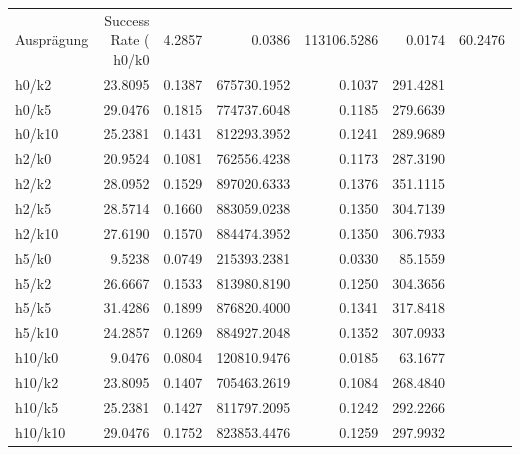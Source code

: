 \begin{tabular}{lrrrrr}
\toprule
Ausprägung & Success Rate (%
\midrule
h0/k0 & 4.2857 & 0.0386 & 113106.5286 & 0.0174 & 60.2476 \\
h0/k2 & 23.8095 & 0.1387 & 675730.1952 & 0.1037 & 291.4281 \\
h0/k5 & 29.0476 & 0.1815 & 774737.6048 & 0.1185 & 279.6639 \\
h0/k10 & 25.2381 & 0.1431 & 812293.3952 & 0.1241 & 289.9689 \\
h2/k0 & 20.9524 & 0.1081 & 762556.4238 & 0.1173 & 287.3190 \\
h2/k2 & 28.0952 & 0.1529 & 897020.6333 & 0.1376 & 351.1115 \\
h2/k5 & 28.5714 & 0.1660 & 883059.0238 & 0.1350 & 304.7139 \\
h2/k10 & 27.6190 & 0.1570 & 884474.3952 & 0.1350 & 306.7933 \\
h5/k0 & 9.5238 & 0.0749 & 215393.2381 & 0.0330 & 85.1559 \\
h5/k2 & 26.6667 & 0.1533 & 813980.8190 & 0.1250 & 304.3656 \\
h5/k5 & 31.4286 & 0.1899 & 876820.4000 & 0.1341 & 317.8418 \\
h5/k10 & 24.2857 & 0.1269 & 884927.2048 & 0.1352 & 307.0933 \\
h10/k0 & 9.0476 & 0.0804 & 120810.9476 & 0.0185 & 63.1677 \\
h10/k2 & 23.8095 & 0.1407 & 705463.2619 & 0.1084 & 268.4840 \\
h10/k5 & 25.2381 & 0.1427 & 811797.2095 & 0.1242 & 292.2266 \\
h10/k10 & 29.0476 & 0.1752 & 823853.4476 & 0.1259 & 297.9932 \\
\bottomrule
\end{tabular}
